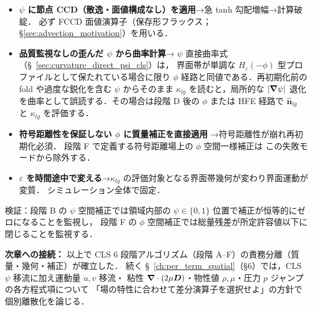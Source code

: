 \begin{itemize}
  \item \textbf{$\psi$ に節点 CCD（散逸・面値構成なし）を適用}→急 tanh 勾配増幅→計算破綻．
        必ず FCCD 面値演算子（保存形フラックス；\S\ref{sec:advection_motivation}）を用いる．
  \item \textbf{品質監視なしの歪んだ $\psi$ から曲率計算}→
        $\psi$ 直接曲率式（§~\ref{sec:curvature_direct_psi_cls}）は，
        界面帯が単調な $H_\varepsilon(-\phi)$ 型プロファイルとして保たれている場合に限り
        $\phi$ 経路と同値である．再初期化前の fold や過度な鋭化を含む
        $\psi$ からそのまま $\kappa_{lg}$ を読むと，局所的な
        $|\bm{\nabla}\psi|$ 退化を曲率として誤読する．その場合は段階 D 後の
        $\phi$ または HFE 経路で $\hat{\bm n}_{lg}$ と $\kappa_{lg}$ を評価する．
  \item \textbf{符号距離性を保証しない $\phi$ に質量補正を直接適用}
        →符号距離性が崩れ再初期化必須．
        段階 F で定義する符号距離場上の $\phi$ 空間一様補正は
        この失敗モードから除外する．
  \item \textbf{$\varepsilon$ を時間途中で変える}→$\kappa_{lg}$ の評価対象となる界面帯幾何が変わり界面運動が変質．
        シミュレーション全体で固定．
\end{itemize}

\noindent 検証：段階 B の $\psi$ 空間補正では領域内部の
$\psi\in\{0,1\}$ 位置で補正が恒等的にゼロになることを監視し，
段階 F の $\phi$ 空間補正では総量残差が所定許容値以下に閉じることを監視する．

\medskip
\noindent\textbf{次章への接続：}
以上で CLS 6 段階アルゴリズム（段階 A--F）の責務分離（質量・幾何・補正）が確立した．
続く §~\ref{ch:per_term_spatial}（§6）では，CLS $\psi$ 移流に加え運動量 $u,v$ 移流・
粘性 $\bm{\nabla}\cdot(2\mu\bm{D})$・物性値 $\rho,\mu$・圧力 $p$ ジャンプの各方程式項について
「場の特性に合わせて差分演算子を選択せよ」の方針で個別離散化を論じる．

